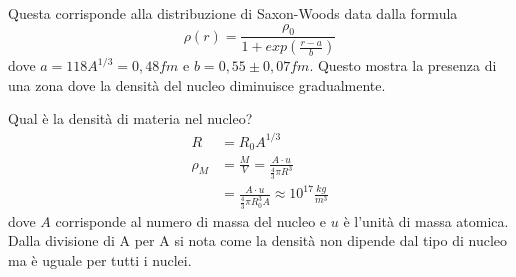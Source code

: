 Questa corrisponde alla distribuzione di Saxon-Woods data dalla formula
\begin{equation}
\rho(r)=\frac{\rho_0}{1+exp\left(\frac{r-a}{b}\right)}
\end{equation}
dove $a=118A^{1/3}=0,48fm$ e $b=0,55\pm 0,07fm$.
Questo mostra la presenza di una zona dove la densità del nucleo diminuisce gradualmente.

Qual è la densità di materia nel nucleo?
\begin{equation}
\begin{split}
R&=R_0A^{1/3}\\
\rho_{M}&=\frac{M}{V}=\frac{A\cdot u}{\frac{4}{3}\pi R^3}\\
&=\frac{A\cdot u}{\frac{4}{3}\pi R_0^3A}\approx10^{17}\frac{kg}{m^3}
\end{split}
\end{equation}
dove $A$ corrisponde al numero di massa del nucleo e $u$ è l'unità di massa atomica. 
Dalla divisione di A per A si nota come la densità non dipende dal tipo di nucleo ma è uguale per tutti i nuclei.
